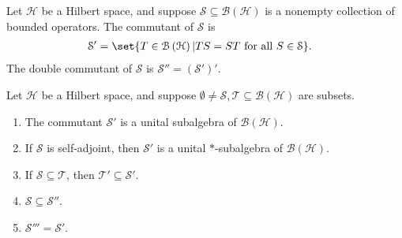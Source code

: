 \documentclass[10pt]{mypackage}
\begin{document}
\begin{definition}
  Let $\mathcal{H}$ be a Hilbert space, and suppose $\mathcal{S}\subseteq \mathcal{B}\left(\mathcal{H}\right)$ is a nonempty collection of bounded operators. The commutant of $\mathcal{S}$ is
  \begin{align*}
    \mathcal{S}' &= \set{T\in \mathcal{B}\left(\mathcal{H}\right) | TS = ST\text{ for all }S\in \mathcal{S}}.
  \end{align*}
  The double commutant of $\mathcal{S}$ is $\mathcal{S}'' = \left(\mathcal{S}'\right)'$.
\end{definition}
\begin{exercise}
  Let $\mathcal{H}$ be a Hilbert space, and suppose $\emptyset\neq \mathcal{S},\mathcal{T}\subseteq \mathcal{B}\left(\mathcal{H}\right)$ are subsets.
  \begin{enumerate}[(1)]
    \item The commutant $\mathcal{S}'$ is a unital subalgebra of $\mathcal{B}\left(\mathcal{H}\right)$.
    \item If $\mathcal{S}$ is self-adjoint, then $\mathcal{S}'$ is a unital $\ast$-subalgebra of $\mathcal{B}\left(\mathcal{H}\right)$.
    \item If $\mathcal{S}\subseteq \mathcal{T}$, then $\mathcal{T}' \subseteq \mathcal{S}'$.
    \item $\mathcal{S}\subseteq \mathcal{S}''$.
    \item $\mathcal{S}''' = \mathcal{S}'$.
  \end{enumerate}
\end{exercise}
\end{document}
